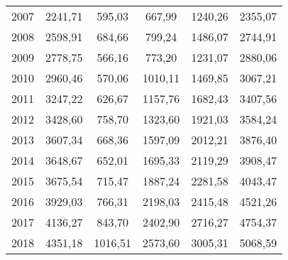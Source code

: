 \begin{center}
\begin{longtable}{|r|c|c|c|c|l|}
	2007 & 2241,71 & 595,03  & 667,99  & 1240,26 & 2355,07 \\
	2008 & 2598,91 & 684,66  & 799,24  & 1486,07 & 2744,91 \\
	2009 & 2778,75 & 566,16  & 773,20  & 1231,07 & 2880,06 \\
	2010 & 2960,46 & 570,06  & 1010,11 & 1469,85 & 3067,21 \\
	2011 & 3247,22 & 626,67  & 1157,76 & 1682,43 & 3407,56 \\
	2012 & 3428,60 & 758,70  & 1323,60 & 1921,03 & 3584,24 \\
	2013 & 3607,34 & 668,36  & 1597,09 & 2012,21 & 3876,40 \\
	2014 & 3648,67 & 652,01  & 1695,33 & 2119,29 & 3908,47 \\
	2015 & 3675,54 & 715,47  & 1887,24 & 2281,58 & 4043,47 \\
	2016 & 3929,03 & 766,31  & 2198,03 & 2415,48 & 4521,26 \\
	2017 & 4136,27 & 843,70  & 2402,90 & 2716,27 & 4754,37 \\
	2018 & 4351,18 & 1016,51 & 2573,60 & 3005,31 & 5068,59 \\ \hline
	\end{longtable}
\end{center}

